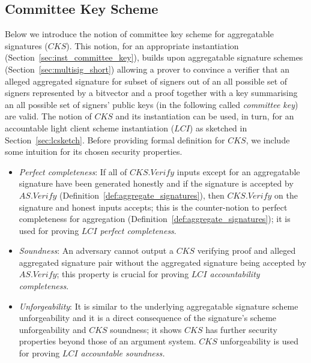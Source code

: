 \subsection{Committee Key Scheme}
\label{sec:committee_key}
Below we introduce the notion of committee key scheme for aggregatable signatures ($\mathit{CKS}$). 
This notion, for an appropriate instantiation (Section~\ref{sec:inst_committee_key}),  
builds upon aggregatable signature schemes (Section~\ref{sec:multisig_short}) allowing a prover to convince a verifier that an alleged aggregated signature 
for subset of signers out of an all possible set of signers represented by a bitvector and a proof together with a key summarising an all possible set of signers' 
public keys (in the following called \emph{committee key}) are valid. The notion of $\mathit{CKS}$ and its instantiation can be used, in turn, for an accountable 
light client scheme instantiation ($\mathit{LCI}$) as sketched in Section~\ref{sec:lcsketch}. Before providing formal definition for $\mathit{CKS}$, 
we include some intuition for its chosen security properties.  
\begin{itemize}
\item \emph{Perfect completeness}: If all of $\mathit{CKS.Verify}$ inputs except for an aggregatable signature have been generated honestly and if the signature is accepted 
by $\mathit{AS.Verify}$ (Definition~\ref{def:aggregate_signatures}), then $\mathit{CKS.Verify}$ on the signature and honest inputs accepts; this is the counter-notion to perfect completeness for aggregation 
(Definition~\ref{def:aggregate_signatures}); it is used for proving \emph{$\mathit{LCI}$ perfect completeness}. 
\item \emph{Soundness}: An adversary cannot output a $\mathit{CKS}$ verifying proof and alleged aggregated signature pair without the aggregated signature being accepted 
by $\mathit{AS.Verify}$; this property is crucial for proving \emph{$\mathit{LCI}$ accountability completeness}. 
\item \emph{Unforgeability}: It is similar to the underlying aggregatable signature scheme unforgeability 
and it is a direct consequence of the signature's scheme unforgeability and $\mathit{CKS}$ soundness; 
it shows $\mathit{CKS}$ has further security properties beyond those of an argument system. $\mathit{CKS}$ unforgeability 
is used for proving \emph{$\mathit{LCI}$ accountable soundness.}
\end{itemize}
\vspace{-0.1in}
